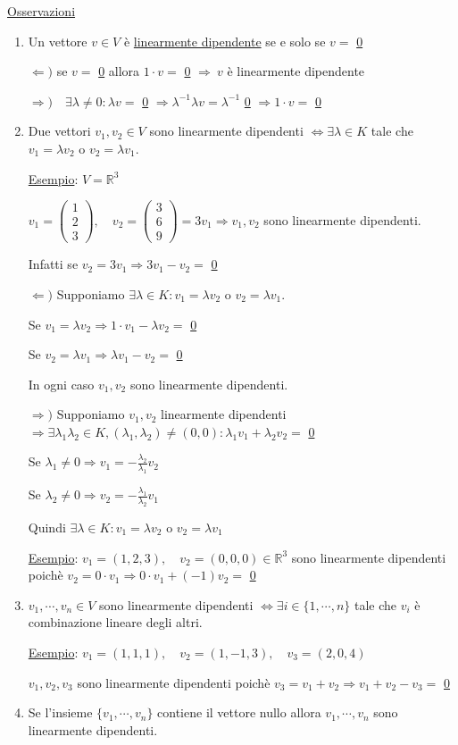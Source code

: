 \documentclass{article}
\newcommand{\ul}[1]{\underline{#1}}
\newcommand{\R}{\mathbb{R}}
\begin{document}
\ul{Osservazioni}
\begin{enumerate}
	\item Un vettore $v\in V$ è \ul{linearmente dipendente} se e solo se $v=$ \ul{0}

	      $\Leftarrow)$ se $v=$ \ul{0} allora $1\cdot v=$ \ul{0} $\Rightarrow\ v$ è linearmente dipendente

	      $\Rightarrow)\quad\exists\lambda\not=0:\lambda v=$ \ul{0} $\Rightarrow\lambda^{-1}\lambda v=\lambda^{-1}$ \ul{0} $\Rightarrow1\cdot v=$ \ul{0}
	\item Due vettori $v_1,v_2\in V$ sono linearmente dipendenti $\Leftrightarrow\exists\lambda\in K$ tale che $v_1=\lambda v_2$ o $v_2=\lambda v_1$.

	      \ul{Esempio}: $V=\R^3$

	      $v_1=\begin{pmatrix}1\\2\\3\end{pmatrix},\quad v_2=\begin{pmatrix}3\\6\\9\end{pmatrix}=3v_1\Rightarrow v_1,v_2$ sono linearmente dipendenti.

	      Infatti se $v_2=3v_1\Rightarrow3v_1-v_2=$ \ul{0}

	      $\Leftarrow)$ Supponiamo $\exists\lambda\in K:v_1=\lambda v_2$ o $v_2=\lambda v_1$.

	      Se $v_1=\lambda v_2\Rightarrow1\cdot v_1-\lambda v_2=$ \ul{0}

	      Se $v_2=\lambda v_1\Rightarrow\lambda v_1-v_2=$ \ul{0}

	      In ogni caso $v_1,v_2$ sono linearmente dipendenti.

	      $\Rightarrow)$ Supponiamo $v_1,v_2$ linearmente dipendenti $\Rightarrow\exists\lambda_1\lambda_2\in K,(\lambda_1,\lambda_2)\not=(0,0):\lambda_1v_1+\lambda_2v_2=$ \ul{0}

	      Se $\lambda_1\not=0\Rightarrow v_1=-\frac{\lambda_2}{\lambda_1}v_2$

	      Se $\lambda_2\not=0\Rightarrow v_2=-\frac{\lambda_1}{\lambda_2}v_1$

	      Quindi $\exists\lambda\in K:v_1=\lambda v_2$ o $v_2=\lambda v_1$

	      \ul{Esempio}: $v_1=(1,2,3),\quad v_2=(0,0,0)\in\R^3$ sono linearmente dipendenti poichè $v_2=0\cdot v_1\Rightarrow0\cdot v_1+(-1)v_2=$ \ul{0}
	\item $v_1,\cdots,v_n\in V$ sono linearmente dipendenti $\Leftrightarrow\exists i\in\{1,\cdots,n\}$ tale che $v_i$ è combinazione lineare degli altri.

	      \ul{Esempio}: $v_1=(1,1,1),\quad v_2=(1,-1,3),\quad v_3=(2,0,4)$

	      $v_1,v_2,v_3$ sono linearmente dipendenti poichè $v_3=v_1+v_2\Rightarrow v_1+v_2-v_3=$ \ul{0}
	\item Se l'insieme $\{v_1,\cdots,v_n\}$ contiene il vettore nullo allora $v_1,\cdots,v_n$ sono linearmente dipendenti.
\end{enumerate}
\end{document}
